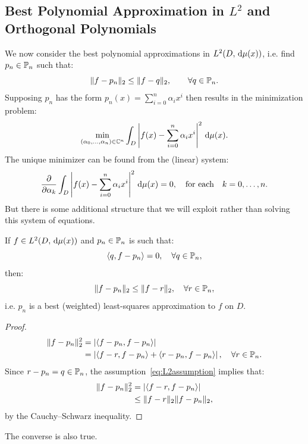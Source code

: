 \subsection{Best Polynomial Approximation in $L^2$ and Orthogonal Polynomials}

We now consider the best polynomial approximations in $L^2(D,\ud\mu(x))$, i.e. find $p_n\in\P_n$ such that:
\[
\|f-p_n\|_2 \le \|f-q\|_2,\qquad\forall q\in\P_n.
\]
Supposing $p_n$ has the form $p_n(x) = \sum_{i=0}^n \alpha_i x^i$ then results in the minimization problem:
\[
\min_{(\alpha_0,\ldots,\alpha_n)\in\C^n} \int_D \abs{f(x)-\sum_{i=0}^n \alpha_i x^i}^2\ud\mu(x).
\]
The unique minimizer can be found from the (linear) system:
\[
\dfrac{\partial}{\partial\alpha_k}\int_D \abs{f(x)-\sum_{i=0}^n \alpha_i x^i}^2\ud\mu(x) = 0,\quad\hbox{for each}\quad k=0,\ldots,n.
\]
But there is some additional structure that we will exploit rather than solving this system of equations.

\begin{theorem}
If $f\in L^2(D,\ud\mu(x))$ and $p_n\in\P_n$ is such that:
\begin{equation}\label{eq:L2assumption}
\langle q,f-p_n\rangle = 0,\quad \forall q\in\P_n,
\end{equation}
then:
\begin{equation}
\|f-p_n\|_2 \le \|f-r\|_2,\quad \forall r\in\P_n,
\end{equation}
i.e. $p_n$ is a best (weighted) least-squares approximation to $f$ on $D$.
\end{theorem}
\begin{proof}
\begin{align*}
\|f-p_n\|_2^2 & = \abs{\langle f-p_n,f-p_n\rangle}\\
& = \abs{\langle f-r,f-p_n\rangle + \langle r-p_n,f-p_n\rangle},\quad \forall r\in\P_n.
\end{align*}
Since $r-p_n=q\in\P_n$, the assumption~\eqref{eq:L2assumption} implies that:
\begin{align*}
\|f-p_n\|_2^2 & = \abs{\langle f-r,f-p_n\rangle}\\
& \le \|f-r\|_2\|f-p_n\|_2,
\end{align*}
by the Cauchy--Schwarz inequality.
\end{proof}
\begin{remark}
The converse is also true.
\end{remark}

